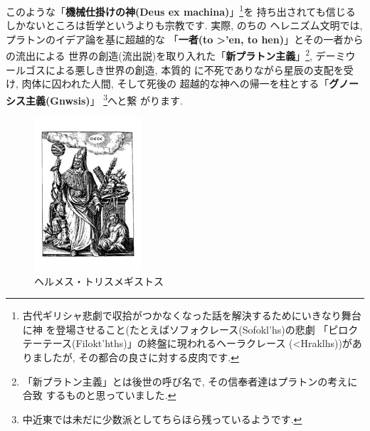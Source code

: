 このような「\textbf{機械仕掛けの神(Deus ex machina)}」\footnote{
古代ギリシャ悲劇で収拾がつかなくなった話を解決するためにいきなり舞台に神
を登場させること(たとえばソフォクレース(\textgreek{Sofokl'hs})の悲劇
「ピロクテーテース(\textgreek{Filokt'hths})」の終盤に現われるヘーラクレース
(\textgreek{<Hraklhs}))がありましたが, その都合の良さに対する皮肉です.}を
持ち出されても信じるしかないところは哲学というよりも宗教です. 実際, のちの
ヘレニズム文明では, プラトンのイデア論を基に超越的な
「\textbf{一者(\textgreek{to >'en}, to hen)}」とその一者からの流出による
世界の創造(流出説)を取り入れた「\textbf{新プラトン主義}」\footnote{
「新プラトン主義」とは後世の呼び名で, その信奉者達はプラトンの考えに合致
するものと思っていました.}, デーミウールゴスによる悪しき世界の創造, 本質的
に不死でありながら星辰の支配を受け, 肉体に囚われた人間, そして死後の
超越的な神への帰一を柱とする「\textbf{グノーシス主義(\textgreek{Gnwsis})}」
\footnote{中近東では未だに少数派としてちらほら残っているようです.}へと繋
がります.
\newline


\begin{figure}
\includegraphics[width=4cm]{HermesTrismegistusCauc.pdf}
\caption{ヘルメス・トリスメギストス}
\label{fig:trismegistus}
\end{figure}

